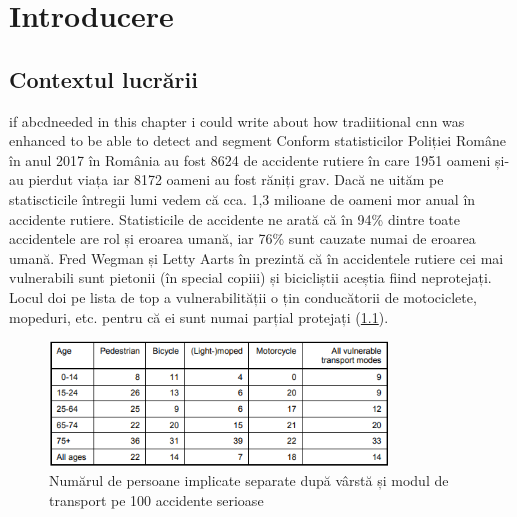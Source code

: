 
\chapter{Introducere}
\label{cap:Introducere}
 \section{Contextul lucrării}
if abcdneeded in this chapter i could write about how tradiitional cnn was enhanced to be able to detect and segment \newline
Conform statisticilor Poliției Române \cite{politia_romana}  în anul 2017 în România au fost 8624 de accidente rutiere în care 1951 oameni și-au pierdut viața iar 8172 oameni au fost răniți grav. Dacă ne uităm pe statiscticile întregii lumi \cite{WHO}  vedem că cca. 1,3 milioane de oameni mor anual în accidente rutiere.\newline
Statisticile de accidente ne arată că  în 94\% dintre toate accidentele are rol și eroarea umană, iar 76\% sunt cauzate numai de eroarea umană.
 Fred Wegman și Letty Aarts  în \cite{SWOV} prezintă că în accidentele rutiere cei mai vulnerabili sunt pietonii (în special copiii) și bicicliștii aceștia fiind neprotejați. Locul doi pe lista de top a vulnerabilității o țin conducătorii de motociclete, mopeduri, etc. pentru că ei sunt numai parțial protejați (\ref{fig:lethalities}).\newline

\begin{figure}[h!]
    	\centering
	\captionsetup{justification=centering, margin=2cm}
	\includegraphics[width=0.8\textwidth]{figures/lethality_rates.png}
	\caption{Numărul de persoane implicate separate după vârstă și modul de transport pe 100 accidente serioase \cite{SWOV}}
	\label{fig:lethalities}
\end{figure}

